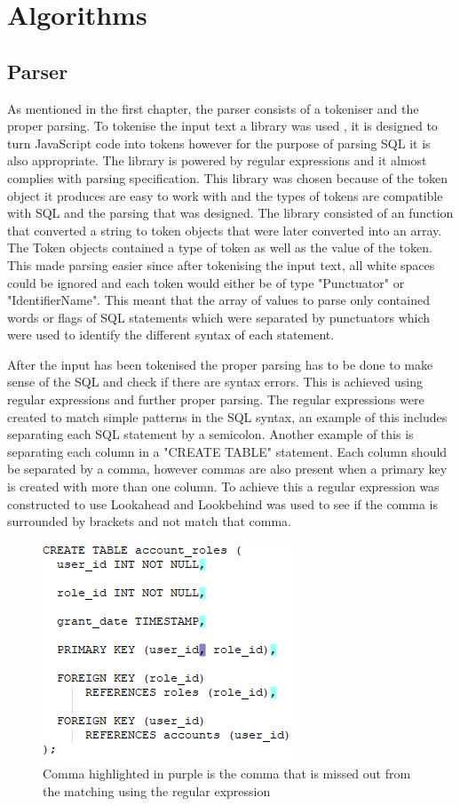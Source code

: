 \newpage

\section{Algorithms}

\subsection{Parser}

As mentioned in the first chapter, the parser consists of a tokeniser and the proper parsing. To tokenise the input text a library was used \cite{tokeniser}, it is designed to turn JavaScript code into tokens however for the purpose of parsing SQL it is also appropriate. The library is powered by regular expressions and it almost complies with parsing specification. This library was chosen because of the token object it produces are easy to work with and the types of tokens are compatible with SQL and the parsing that was designed. The library consisted of an function that converted a string to token objects that were later converted into an array. The Token objects contained a type of token as well as the value of the token. This made parsing easier since after tokenising the input text, all white spaces could be ignored and each token would either be of type "Punctuator" or "IdentifierName". This meant that the array of values to parse only contained words or flags of SQL statements which were separated by punctuators which were used to identify the different syntax of each statement.

After the input has been tokenised the proper parsing has to be done to make sense of the SQL and check if there are syntax errors. This is achieved using regular expressions and further proper parsing. The regular expressions were created to match simple patterns in the SQL syntax, an example of this includes separating each SQL statement by a semicolon. Another example of this is separating each column in a "CREATE TABLE" statement. Each column should be separated by a comma, however commas are also present when a primary key is created with more than one column. To achieve this a regular expression was constructed to use Lookahead and Lookbehind was used to see if the comma is surrounded by brackets and not match that comma.

\begin{figure}[h!]
	\centering
	\includegraphics{regex}
	\caption{Comma highlighted in purple is the comma that is missed out from the matching using the regular expression}
	\label{fig:regex}
\end{figure}


